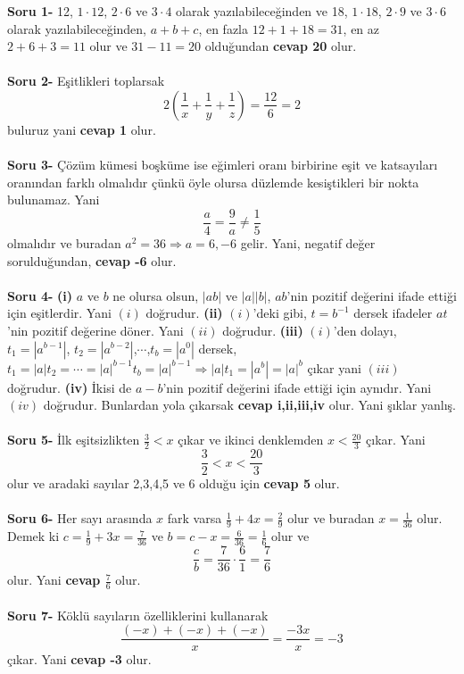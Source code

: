 \documentclass[a4paper,12pt,twocolumn]{article}
\begin{document}
\textbf{Soru 1-} 12, $1\cdot12$, $2\cdot6$ ve $3\cdot4$ olarak yazılabileceğinden ve 18, $1\cdot18$, $2\cdot9$ ve $3\cdot6$ olarak yazılabileceğinden, $a+b+c$, en fazla $12+1+18=31$, en az $2+6+3=11$ olur ve $31-11=20$ olduğundan \textbf{cevap 20} olur.
\\ \\
\textbf{Soru 2-} Eşitlikleri toplarsak $$2\left(\frac{1}{x}+\frac{1}{y}+\frac{1}{z}\right)=\frac{12}{6}=2$$ buluruz yani \textbf{cevap 1} olur.
\\ \\
\textbf{Soru 3-} Çözüm kümesi boşküme ise eğimleri oranı birbirine eşit ve katsayıları oranından farklı olmalıdır çünkü öyle olursa düzlemde kesiştikleri bir nokta bulunamaz. Yani $$\frac{a}{4}=\frac{9}{a}\neq\frac{1}{5}$$ olmalıdır ve buradan $a^2=36\Rightarrow a=6,-6$ gelir. Yani, negatif değer sorulduğundan, \textbf{cevap -6} olur.
\\ \\
\textbf{Soru 4-} \textbf{(i)} $a$ ve $b$ ne olursa olsun, $|ab|$ ve $|a||b|$, $ab$'nin pozitif değerini ifade ettiği için eşitlerdir. Yani $(i)$ doğrudur. \textbf{(ii)} $(i)$'deki gibi, $t=b^{-1}$ dersek ifadeler $at$'nin pozitif değerine döner. Yani $(ii)$ doğrudur. \textbf{(iii)} $(i)$'den dolayı, $t_1=|a^{b-1}|$, $t_2=|a^{b-2}|$,$\cdots$,$t_b=|a^0|$ dersek, $t_1=|a|t_{2}=\cdots=|a|^{b-1}t_b=|a|^{b-1}\Rightarrow |a|t_1=|a^b|=|a|^b$ çıkar yani $(iii)$ doğrudur. \textbf{(iv)} İkisi de $a-b$'nin pozitif değerini ifade ettiği için aynıdır. Yani $(iv)$ doğrudur. Bunlardan yola çıkarsak \textbf{cevap i,ii,iii,iv} olur. Yani şıklar yanlış.
\\ \\
\textbf{Soru 5-} İlk eşitsizlikten $\frac{3}{2}<x$ çıkar ve ikinci denklemden $x<\frac{20}{3}$ çıkar. Yani $$\frac{3}{2}<x<\frac{20}{3}$$ olur ve aradaki sayılar 2,3,4,5 ve 6 olduğu için \textbf{cevap 5} olur.
\\ \\
\textbf{Soru 6-} Her sayı arasında $x$ fark varsa $\frac{1}{9}+4x=\frac{2}{9}$ olur ve buradan $x=\frac{1}{36}$ olur. Demek ki $c=\frac{1}{9}+3x=\frac{7}{36}$ ve $b=c-x=\frac{6}{36}=\frac{1}{6}$ olur ve $$\frac{c}{b}=\frac{7}{36}\cdot\frac{6}{1}=\frac{7}{6}$$ olur. Yani \textbf{cevap $\frac{7}{6}$} olur.
\\ \\
\textbf{Soru 7-} Köklü sayıların özelliklerini kullanarak $$\frac{(-x)+(-x)+(-x)}{x}=\frac{-3x}{x}=-3$$ çıkar. Yani \textbf{cevap -3} olur.
\\ \\
\end{document}
